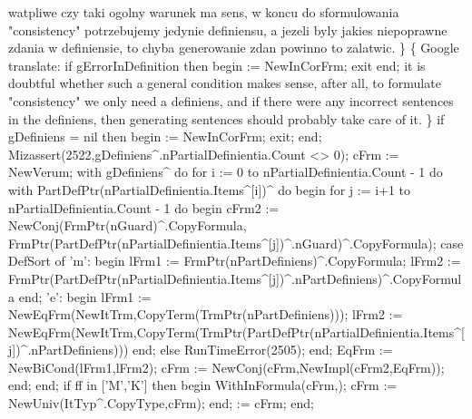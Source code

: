     watpliwe czy taki ogolny warunek ma sens, w koncu do sformulowania
    "consistency" potrzebujemy jedynie definiensu, a jezeli byly jakies
    niepoprawne zdania w definiensie, to chyba generowanie zdan powinno to
    zalatwic.
   \}
   \{ Google translate:
    if gErrorInDefinition then begin  := NewInCorFrm; exit end;
    it is doubtful whether such a general condition makes sense, after all, to formulate
    "consistency" we only need a definiens, and if there were any
    incorrect sentences in the definiens, then generating sentences should probably
    take care of it. \}
   if gDefiniens = nil then
   begin
       := NewInCorFrm; exit;
   end;
   Mizassert(2522,gDefiniens^.nPartialDefinientia.Count <> 0);
   cFrm := NewVerum;
   with gDefiniens^ do
      for i := 0 to nPartialDefinientia.Count - 1 do
         with PartDefPtr(nPartialDefinientia.Items^[i])^ do
      begin
         for j :=  i+1 to nPartialDefinientia.Count - 1 do
         begin
            cFrm2 := NewConj(FrmPtr(nGuard)^.CopyFormula,
                             FrmPtr(PartDefPtr(nPartialDefinientia.Items^[j])^.nGuard)^.CopyFormula);
            case DefSort of
               'm':
                  begin
                     lFrm1 := FrmPtr(nPartDefiniens)^.CopyFormula;
                     lFrm2 := FrmPtr(PartDefPtr(nPartialDefinientia.Items^[j])^.nPartDefiniens)^.CopyFormula
                  end;
               'e':
                  begin
                     lFrm1 := NewEqFrm(NewItTrm,CopyTerm(TrmPtr(nPartDefiniens)));
                     lFrm2 := NewEqFrm(NewItTrm,CopyTerm(TrmPtr(PartDefPtr(nPartialDefinientia.Items^[j])^.nPartDefiniens)))
                  end;
               else RunTimeError(2505);
            end;
            EqFrm := NewBiCond(lFrm1,lFrm2);
            cFrm := NewConj(cFrm,NewImpl(cFrm2,EqFrm));
         end;
      end;
   if ff in ['M','K'] then
   begin
      WithInFormula(cFrm,);
      cFrm := NewUniv(ItTyp^.CopyType,cFrm);
   end;
    := cFrm;
end;
\eatline
{}\nwendcode{}\nwdocspar
